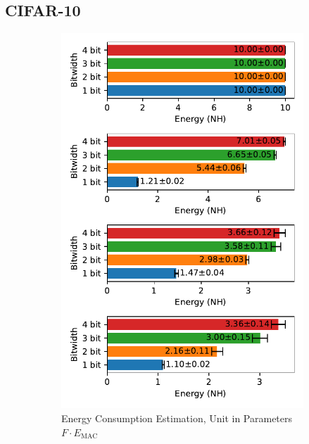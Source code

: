     \subsection{CIFAR-10}
    \label{appendix:energy_neuromorphic_cifar10}

        \begin{figure}[H]
            \centering
            \begin{subfigure}[H]{0.495\textwidth}
                \includegraphics[width=\textwidth]{../standard/CIFAR10/plots/cifar10_test_energy_nh.pdf}
                \caption{Energy Consumption Estimation, Unit in Parameters $F\cdot E_{\text{MAC}}$}
            \end{subfigure}
            \hfill
            \begin{subfigure}[H]{0.495\textwidth}

\end{subfigure}
\end{figure}

